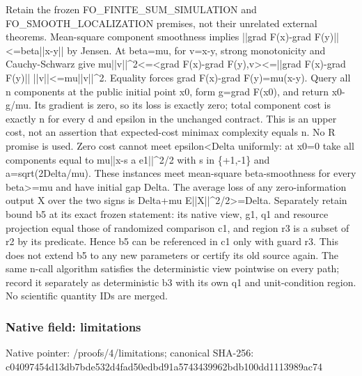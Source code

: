 \documentclass[10pt,a4paper]{article}
\begin{document}
\begingroup\raggedright\sloppy Retain the frozen FO\_\allowbreak{}FINITE\_\allowbreak{}SUM\_\allowbreak{}SIMULATION and FO\_\allowbreak{}SMOOTH\_\allowbreak{}LOCALIZATION premises,\allowbreak{} not their unrelated external theorems. Mean-square component smoothness implies ||grad F(x)-grad F(y)||<=\allowbreak{}beta||x-y|| by Jensen. At beta=\allowbreak{}mu,\allowbreak{} for v=\allowbreak{}x-y,\allowbreak{} strong monotonicity and Cauchy-Schwarz give mu||v||\textasciicircum{}2<=\allowbreak{}<grad F(x)-grad F(y),\allowbreak{}v><=\allowbreak{}||grad F(x)-grad F(y)|| ||v||<=\allowbreak{}mu||v||\textasciicircum{}2. Equality forces grad F(x)-grad F(y)=\allowbreak{}mu(x-y). Query all n components at the public initial point x0,\allowbreak{} form g=\allowbreak{}grad F(x0),\allowbreak{} and return x0-g/\allowbreak{}mu. Its gradient is zero,\allowbreak{} so its loss is exactly zero;\allowbreak{} total component cost is exactly n for every d and epsilon in the unchanged contract. This is an upper cost,\allowbreak{} not an assertion that expected-cost minimax complexity equals n. No R promise is used. Zero cost cannot meet epsilon<Delta uniformly:\allowbreak{} at x0=\allowbreak{}0 take all components equal to mu||x-s a e1||\textasciicircum{}2/\allowbreak{}2 with s in \{+1,\allowbreak{}-1\} and a=\allowbreak{}sqrt(2Delta/\allowbreak{}mu). These instances meet mean-square beta-smoothness for every beta>=\allowbreak{}mu and have initial gap Delta. The average loss of any zero-information output X over the two signs is Delta+mu E||X||\textasciicircum{}2/\allowbreak{}2>=\allowbreak{}Delta. Separately retain bound b5 at its exact frozen statement:\allowbreak{} its native view,\allowbreak{} g1,\allowbreak{} q1 and resource projection equal those of randomized comparison c1,\allowbreak{} and region r3 is a subset of r2 by its predicate. Hence b5 can be referenced in c1 only with guard r3. This does not extend b5 to any new parameters or certify its old source again. The same n-call algorithm satisfies the deterministic view pointwise on every path;\allowbreak{} record it separately as deterministic b3 with its own q1 and unit-condition region. No scientific quantity IDs are merged.\par\endgroup

\subsubsection{Native field: limitations}
Native pointer: /proofs/4/limitations; canonical SHA-256: c04097454d13db7bde532d4fad50edbd91a5743439962bdb100dd1113989ac74
\end{document}
